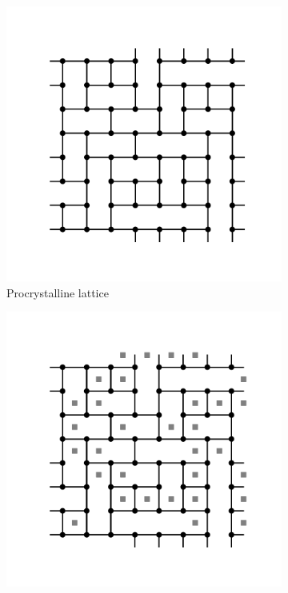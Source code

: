 \begin{figure}[bt]
     \centering
     
     \begin{subfigure}[b]{0.3\textwidth}
         \centering
         \includegraphics[width=\textwidth]{./figures/procrystals/pro_intro3.pdf}
         \caption{Procrystalline lattice}
         \label{fig:prointroa}
     \end{subfigure}
     \hfill
      \begin{subfigure}[b]{0.3\textwidth}
         \centering
         \includegraphics[width=\textwidth]{./figures/procrystals/pro_intro1.pdf}

\end{subfigure}
\end{figure}
